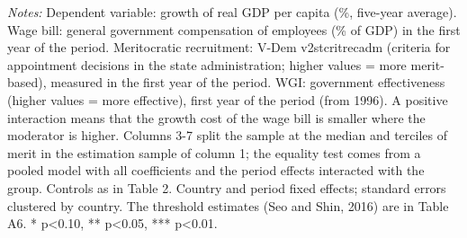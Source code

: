 \begin{table}[htbp]
\begin{minipage}{0.95\linewidth}\vspace{4pt}\scriptsize \textit{Notes:} Dependent variable: growth of real GDP per capita (\%, five-year average). Wage bill: general government compensation of employees (\% of GDP) in the first year of the period. Meritocratic recruitment: V-Dem v2stcritrecadm (criteria for appointment decisions in the state administration; higher values = more merit-based), measured in the first year of the period. WGI: government effectiveness (higher values = more effective), first year of the period (from 1996). A positive interaction means that the growth cost of the wage bill is smaller where the moderator is higher. Columns 3-7 split the sample at the median and terciles of merit in the estimation sample of column 1; the equality test comes from a pooled model with all coefficients and the period effects interacted with the group. Controls as in Table 2. Country and period fixed effects; standard errors clustered by country. The threshold estimates (Seo and Shin, 2016) are in Table A6. * p<0.10, ** p<0.05, *** p<0.01.\end{minipage}
\end{table}
